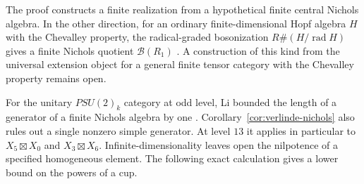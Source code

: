 \documentclass[11pt,reqno]{amsart}
\theoremstyle{definition}
\begin{document}
The proof constructs a finite realization from a hypothetical finite central Nichols algebra. In the other direction, for an ordinary finite-dimensional Hopf algebra $H$ with the Chevalley property, the radical-graded bosonization $R\#(H/\operatorname{rad} H)$ gives a finite Nichols quotient $\mathcal B(R_1)$ \cite{AS}. A construction of this kind from the universal extension object for a general finite tensor category with the Chevalley property remains open.

For the unitary $PSU(2)_k$ category at odd level, Li bounded the length of a generator of a finite Nichols algebra by one \cite[Theorem~6.4]{LiNichols}. Corollary~\ref{cor:verlinde-nichols} also rules out a single nonzero simple generator. At level $13$ it applies in particular to $X_5\boxtimes X_0$ and $X_3\boxtimes X_6$. Infinite-dimensionality leaves open the nilpotence of a specified homogeneous element. The following exact calculation gives a lower bound on the powers of a cup.
\end{document}
